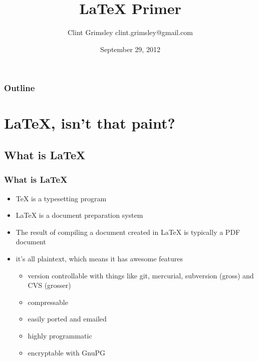 \documentclass{beamer}
\title{LaTeX Primer}
\author{Clint Grimsley clint.grimsley@gmail.com}
\date{September 29, 2012}
\begin{document}
\begin{frame}
\titlepage
\end{frame}

\begin{frame}
  \frametitle{Outline}
    \tableofcontents
\end{frame}

\section{LaTeX, isn't that paint?}
\subsection{What is LaTeX}

\begin{frame}
\frametitle{What is LaTeX}
\begin{itemize}
  \item TeX is a typesetting program
  \item LaTeX is a document preparation system
  \item The result of compiling a document created in LaTeX is
    typically a PDF document
  \item it's all plaintext, which means it has awesome features
    \begin{itemize}
    \item version controllable with things like git, mercurial,
      subversion (gross) and CVS (grosser)
      \item compressable
      \item easily ported and emailed
      \item highly programmatic
      \item encryptable with GnuPG
    \end{itemize}
\end{itemize}
\end{frame}
\end{document}
